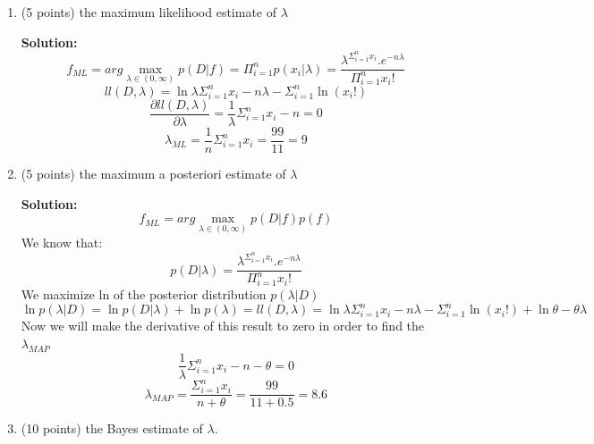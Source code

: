 \documentclass[twoside]{article}
\begin{document}
\begin{enumerate}
\item (5 points) the maximum likelihood estimate of $\lambda$

\textbf{Solution:}
\[
f_{ML} = arg\max_{\lambda \in (0, \infty)} {p(D|f)} = \Pi_{i=1}^{n}{p(x_i | \lambda) = \frac{\lambda^{\Sigma_{i=1}^{n}{x_i}} . e^{-n\lambda}}{\Pi_{i=1}^{n}{x_i!}}}
\]
\[
ll(D,\lambda) = \ln\lambda\Sigma_{i=1}^{n}{x_i} - n\lambda - \Sigma_{i=1}^{n}{\ln(x_i!)}
\]
\[
\frac{\partial ll(D,\lambda)}{\partial \lambda} = \frac{1}{\lambda} \Sigma_{i=1}^{n}{x_i} - n = 0
\]
\[
\lambda_{ML} = \frac{1}{n} \Sigma_{i=1}^{n}{x_i} = \frac{99}{11} = 9
\]

\item (5 points) the maximum a posteriori estimate of $\lambda$

\textbf{Solution:}
\[
f_{ML} = arg\max_{\lambda \in (0, \infty)} {p(D|f)p(f)}
\]
We know that:
\[
p(D | \lambda) = \frac{\lambda^{\Sigma_{i=1}^{n}{x_i}} . e^{-n\lambda}}{\Pi_{i=1}^{n}{x_i!}}
\]
We maximize ln of the posterior distribution $p(\lambda | D)$
\[
\ln p(\lambda | D) = \ln p(D|\lambda) + \ln p(\lambda)
= ll(D,\lambda) = \ln\lambda\Sigma_{i=1}^{n}{x_i} - n\lambda - \Sigma_{i=1}^{n}{\ln(x_i!)} + \ln \theta - \theta \lambda
\]
Now we will make the derivative of this result to zero in order to find the $\lambda_{MAP}$
\[
\frac{1}{\lambda} \Sigma_{i=1}^{n}{x_i} - n - \theta = 0
\]
\[
\lambda_{MAP} = \frac{\Sigma_{i=1}^{n}{x_i}}{n+\theta} = \frac{99}{11 + 0.5} = 8.6
\]

\item (10 points) the Bayes estimate of $\lambda$.


\end{enumerate}
\end{document}
